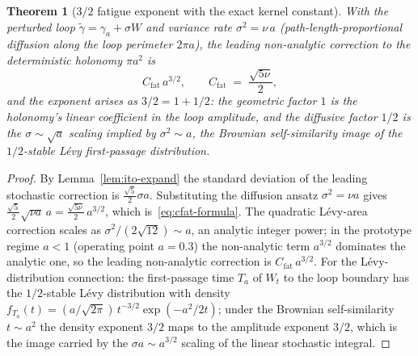\documentclass[11pt,a4paper]{article}
\theoremstyle{plain}
\newtheorem{theorem}{Theorem}[section]
\theoremstyle{definition}
\theoremstyle{remark}
\begin{document}
\begin{theorem}[$3/2$ fatigue exponent with the exact kernel
constant]\label{thm:levy-3half}
With the perturbed loop $\tilde\gamma=\gamma_a+\sigma W$ and
variance rate $\sigma^{2}=\nu\,a$ (path-length-proportional
diffusion along the loop perimeter $2\pi a$), the leading
non-analytic correction to the deterministic holonomy $\pi a^{2}$
is
\begin{equation}\label{eq:cfat-formula}
  C_{\mathrm{fat}}\,a^{3/2},\qquad
  C_{\mathrm{fat}} \;=\; \frac{\sqrt{5\nu}}{2},
\end{equation}
and the exponent arises as $3/2=1+1/2$: the geometric factor $1$
is the holonomy's linear coefficient in the loop amplitude, and
the diffusive factor $1/2$ is the $\sigma\sim\sqrt{a}$ scaling
implied by $\sigma^{2}\sim a$, the Brownian self-similarity image
of the $1/2$-stable L\'evy first-passage distribution.
\end{theorem}

\begin{proof}
By Lemma~\ref{lem:ito-expand} the standard deviation of the
leading stochastic correction is $\tfrac{\sqrt5}{2}\sigma a$.
Substituting the diffusion ansatz $\sigma^{2}=\nu a$ gives
$\tfrac{\sqrt5}{2}\sqrt{\nu a}\,a=\tfrac{\sqrt{5\nu}}{2}\,
a^{3/2}$, which is~\eqref{eq:cfat-formula}. The quadratic
L\'evy-area correction scales as
$\sigma^{2}/(2\sqrt{12})\sim a$, an analytic integer power; in the
prototype regime $a<1$ (operating point $a=0.3$) the non-analytic
term $a^{3/2}$ dominates the analytic one, so the leading
non-analytic correction is $C_{\mathrm{fat}}\,a^{3/2}$. For the
L\'evy-distribution connection: the first-passage time $T_a$ of
$W_t$ to the loop boundary has the $1/2$-stable L\'evy
distribution with density $f_{T_a}(t)=(a/\sqrt{2\pi})\,
t^{-3/2}\exp(-a^{2}/2t)$; under the Brownian self-similarity
$t\sim a^{2}$ the density exponent $3/2$ maps to the amplitude
exponent $3/2$, which is the image carried by the
$\sigma a\sim a^{3/2}$ scaling of the linear stochastic integral.
\end{proof}
\end{document}
